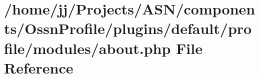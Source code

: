 \hypertarget{_ossn_profile_2plugins_2default_2profile_2modules_2about_8php}{}\section{/home/jj/\+Projects/\+A\+S\+N/components/\+Ossn\+Profile/plugins/default/profile/modules/about.php File Reference}
\label{_ossn_profile_2plugins_2default_2profile_2modules_2about_8php}
